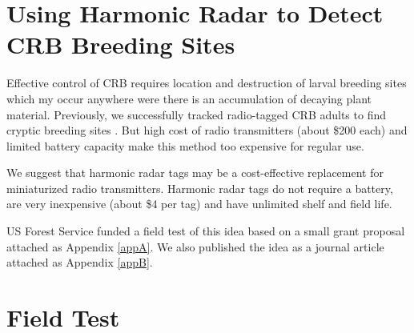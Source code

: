 \documentclass[12pt,letterpaper,english,bibliography=totocnumbered, abstract=on]{scrartcl}
\begin{document}
%
%
%
%
%

\section{Using Harmonic Radar to Detect CRB Breeding Sites}

Effective control of CRB requires location and destruction of larval breeding sites which my occur anywhere were there is an accumulation of decaying plant material. Previously, we successfully tracked radio-tagged CRB adults to find cryptic breeding sites \cite{moore_judas_2017-1}. But high cost of radio transmitters (about \$200 each) and limited battery capacity make this method too expensive for regular use. 

We suggest that harmonic radar tags may be a cost-effective replacement for miniaturized radio transmitters. Harmonic radar tags do not require a battery, are very inexpensive (about \$4 per tag) and have unlimited shelf and field life. 

US Forest Service funded a field test of this idea based on a small grant proposal  attached as Appendix \ref{appA}. We also published the idea as a journal article \cite{mooreProposalDetectingCoconut2022} attached as Appendix \ref{appB}.

\newpage
\section{Field Test}
\end{document}
